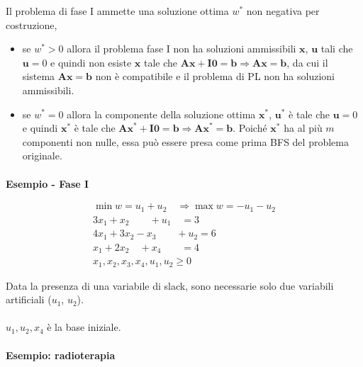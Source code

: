 \documentclass[a4paper, 11pt]{article}
\begin{document}
        Il problema di fase I ammette una soluzione ottima $w^*$ non negativa per costruzione,

        \begin{itemize}
            \item se $w^* > 0$ allora il problema fase I non ha soluzioni ammissibili $\mathbf{x}$, $\mathbf{u}$ tali che $\mathbf{u} = 0$ e quindi non esiste $\mathbf{x}$ tale che $\mathbf{Ax} + \mathbf{I0} = \mathbf{b} \Rightarrow \mathbf{Ax} = \mathbf{b}$, da cui il sistema $\mathbf{Ax} = \mathbf{b}$ non è compatibile e il problema di PL non ha soluzioni ammissibili.
            \item se $w^* = 0$ allora la componente della soluzione ottima $\mathbf{x}^*$, $\mathbf{u}^*$ è tale che $\mathbf{u} = 0$ e quindi $\mathbf{x}^*$ è tale che $\mathbf{Ax}^* + \mathbf{I0} = \mathbf{b} \Rightarrow \mathbf{Ax}^* = \mathbf{b}$. Poiché $\mathbf{x}^*$ ha al più $m$ componenti non nulle, essa può essere presa come prima BFS del problema originale.
        \end{itemize}

        \paragraph{}
        \textbf{Esempio - Fase I}

        \begin{align*}
            \min w = u_1 + u_2 \quad  \Rightarrow \max w = -u_1 - u_2 \\
            3x_1 + x_2 \quad \quad  + u_1 \quad  = 3 \\
            4x_1 + 3x_2 - x_3 \quad \quad + u_2 = 6 \\
            x_1 + 2x_2  \quad + x_4 \quad \quad  = 4 \\
            x_1, x_2, x_3, x_4, u_1, u_2 \geq 0
        \end{align*}
            
        Data la presenza di una variabile di slack, sono necessarie solo due variabili artificiali ($u_1$, $u_2$).

        \paragraph{}
        $u_1, u_2, x_4$ è la base iniziale.

        \paragraph{}
        \textbf{Esempio: radioterapia}
\end{document}
